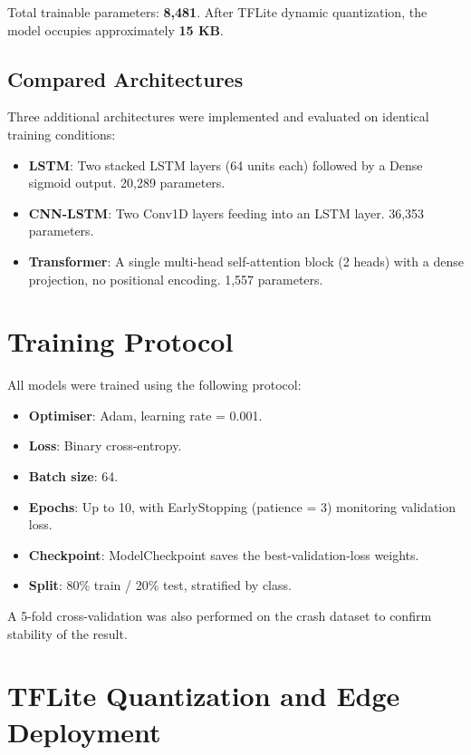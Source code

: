 Total trainable parameters: \textbf{8,481}. After TFLite dynamic quantization, the model occupies approximately \textbf{15 KB}.

\subsection{Compared Architectures}

Three additional architectures were implemented and evaluated on identical training conditions:
\begin{itemize}
    \item \textbf{LSTM}: Two stacked LSTM layers (64 units each) followed by a Dense sigmoid output. 20,289 parameters.
    \item \textbf{CNN-LSTM}: Two Conv1D layers feeding into an LSTM layer. 36,353 parameters.
    \item \textbf{Transformer}: A single multi-head self-attention block (2 heads) with a dense projection, no positional encoding. 1,557 parameters.
\end{itemize}

\section{Training Protocol}
\label{sec:training}

All models were trained using the following protocol:
\begin{itemize}
    \item \textbf{Optimiser}: Adam, learning rate = 0.001.
    \item \textbf{Loss}: Binary cross-entropy.
    \item \textbf{Batch size}: 64.
    \item \textbf{Epochs}: Up to 10, with EarlyStopping (patience = 3) monitoring validation loss.
    \item \textbf{Checkpoint}: ModelCheckpoint saves the best-validation-loss weights.
    \item \textbf{Split}: 80\% train / 20\% test, stratified by class.
\end{itemize}

A 5-fold cross-validation was also performed on the crash dataset to confirm stability of the result.

\section{TFLite Quantization and Edge Deployment}
\label{sec:deployment_method}

